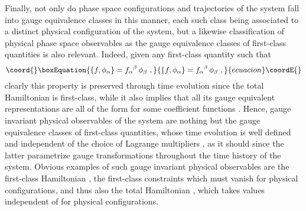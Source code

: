 \documentclass[a4paper,11pt]{article}
\begin{document}
Finally, not only do phase space configurations and trajectories of the
system fall into gauge equivalence classes in this manner, each such class
being associated to a distinct physical configuration of the system,
but a likewise classification of physical phase space observables as
the gauge equivalence classes of first-class quantities is also relevant.
Indeed, given any first-class quantity \coordHE{} such that
\begin{equation}\coord{}\boxEquation{
\{f,\phi_\alpha\}={f_\alpha}^\beta\,\phi_\beta\ ,
}{
\{f,\phi_\alpha\}={f_\alpha}^\beta\,\phi_\beta\ ,
}{ecuacion}\coordE{}\end{equation}
clearly this property is preserved through time evolution since the
total Hamiltonian \coordHE{} is first-class,
while it also implies that all its gauge equivalent representations are
all of the form \coordHE{} for some coefficient functions
\coordHE{}. Hence, gauge invariant physical observables of the
system are nothing but the gauge equivalence classes of first-class
quantities, whose time evolution is well defined and independent of the
choice of Lagrange multipliers \coordHE{}, as it should since the
latter parametrize gauge transformations throughout the time history of
the system. Obvious examples of such gauge invariant physical observables are
the first-class Hamiltonian \coordHE{}, the first-class constraints \myHighlight{$\phi_\alpha$}\coordHE{}
which must vanish for physical configurations, and thus also the total
Hamiltonian \coordHE{}, which takes values independent of \coordHE{}
for physical configurations.
\end{document}
